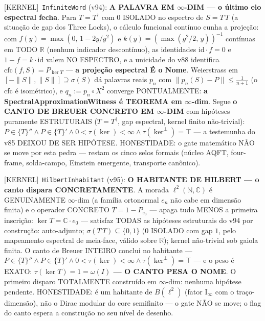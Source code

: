 \documentclass[11pt]{article}
\providecommand{\kernelmk}[1]{\textsf{[KERNEL]}~\texttt{#1}}\providecommand{\knownmk}[1]{\textsf{[KNOWN]}~{#1}}\providecommand{\statusmk}[1]{\textsf{[#1]}}
\theoremstyle{definition}\newtheorem{deriv}{Derivação}
\begin{document}
\kernelmk{InfiniteWord} (v94): \textbf{A PALAVRA EM $\infty$-DIM --- o último elo espectral fecha}. Para $T=T^\dagger$ com $0$ ISOLADO no espectro de $S=T\,T$ (a situação de gap dos Three Locks), o cálculo funcional contínuo cunha a projeção: com $f(y)=\max(0,\,1-2y/g^2)$ e $k(y)=(\max(g^2/2,\,y))^{-1}$ contínuas em TODO $\mathbb R$ (nenhum indicador descontínuo), as identidades $\mathrm{id}\cdot f=0$ e $1-f=k\cdot\mathrm{id}$ valem NO ESPECTRO, e a unicidade do v88 identifica $\mathrm{cfc}(f,S)=P_{\ker T}$ --- \textbf{a projeção espectral É o Nome}. Weierstrass em $[-\|S\|,\|S\|]\supseteq\sigma(S)$ dá palavras reais $p_n$ com $\|p_n(S)-P\|\le\tfrac1{n+1}$ (o cfc é isométrico), e $q_n:=p_n\circ X^2$ converge PONTUALMENTE: \textbf{a SpectralApproximationWitness é TEOREMA em $\infty$-dim}. Segue \textbf{o CANTO DE BREUER CONCRETO EM $\infty$-DIM} com hipóteses puramente ESTRUTURAIS ($T=T^\dagger$, gap espectral, kernel finito não-trivial): $P\in\{T\}''\wedge P\in\{T\}'\wedge 0<\tau(\ker)<\infty\wedge\tau(\ker^\perp)=\top$ --- a testemunha do v85 DEIXOU DE SER HIPÓTESE. HONESTIDADE: o gate matemático NÃO se move por esta pedra --- restam os cinco selos formais (núcleo AQFT, four-frame, solda-campo, Einstein emergente, transporte canônico).

\kernelmk{HilbertInhabitant} (v95): \textbf{O HABITANTE DE HILBERT --- o canto dispara CONCRETAMENTE}. A morada $\ell^2(\mathbb N,\mathbb C)$ é GENUINAMENTE $\infty$-dim (a família ortonormal $e_n$ não cabe em dimensão finita) e o operador CONCRETO $T=1-P_{e_0}$ --- apaga tudo MENOS a primeira inscrição: $\ker T=\mathbb C\cdot e_0$ --- satisfaz TODAS as hipóteses estruturais do v94 por construção: auto-adjunto; $\sigma(T\,T)\subseteq\{0,1\}$ (0 ISOLADO com gap $1$, pelo mapeamento espectral de meia-face, válido sobre $\mathbb R$); kernel não-trivial sob gaiola finita. O canto de Breuer INTEIRO conclui no habitante --- $P\in\{T\}''\wedge P\in\{T\}'\wedge 0<\tau(\ker)<\infty\wedge\tau(\ker^\perp)=\top$ --- e o peso é EXATO: \textbf{$\tau(\ker T)=1=\omega(I)$ --- O CANTO PESA O NOME}. O primeiro disparo TOTALMENTE construído em $\infty$-dim: nenhuma hipótese pendente. HONESTIDADE: é um habitante de $B(\ell^2)$ (fator I$_\infty$ com o traço-dimensão), não o Dirac modular do core semifinito --- o gate NÃO se move; o flag do canto espera a construção no seu nível de desenho.
\end{document}
